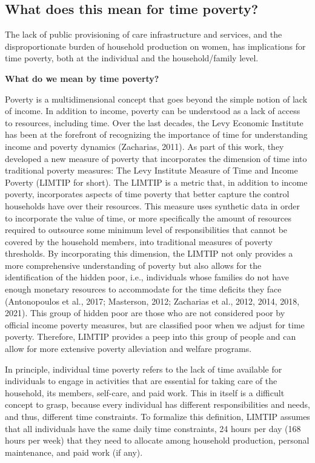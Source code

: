 \documentclass[
  11pt,
]{article}
\begin{document}
\subsection{What does this mean for time
poverty?}\label{what-does-this-mean-for-time-poverty}

The lack of public provisioning of care infrastructure and services, and
the disproportionate burden of household production on women, has
implications for time poverty, both at the individual and the
household/family level.

\textbf{What do we mean by time poverty?}

Poverty is a multidimensional concept that goes beyond the simple notion
of lack of income. In addition to income, poverty can be understood as a
lack of access to resources, including time. Over the last decades, the
Levy Economic Institute has been at the forefront of recognizing the
importance of time for understanding income and poverty dynamics
(Zacharias, 2011). As part of this work, they developed a new measure of
poverty that incorporates the dimension of time into traditional poverty
measures: The Levy Institute Measure of Time and Income Poverty (LIMTIP
for short). The LIMTIP is a metric that, in addition to income poverty,
incorporates aspects of time poverty that better capture the control
households have over their resources. This measure uses synthetic data
in order to incorporate the value of time, or more specifically the
amount of resources required to outsource some minimum level of
responsibilities that cannot be covered by the household members, into
traditional measures of poverty thresholds. By incorporating this
dimension, the LIMTIP not only provides a more comprehensive
understanding of poverty but also allows for the identification of the
hidden poor, i.e., individuals whose families do not have enough
monetary resources to accommodate for the time deficits they face
(Antonopoulos et al., 2017; Masterson, 2012; Zacharias et al., 2012,
2014, 2018, 2021). This group of hidden poor are those who are not
considered poor by official income poverty measures, but are classified
poor when we adjust for time poverty. Therefore, LIMTIP provides a peep
into this group of people and can allow for more extensive poverty
alleviation and welfare programs.

In principle, individual time poverty refers to the lack of time
available for individuals to engage in activities that are essential for
taking care of the household, its members, self-care, and paid work.
This in itself is a difficult concept to grasp, because every individual
has different responsibilities and needs, and thus, different time
constraints. To formalize this definition, LIMTIP assumes that all
individuals have the same daily time constraints, 24 hours per day (168
hours per week) that they need to allocate among household production,
personal maintenance, and paid work (if any).
\end{document}
